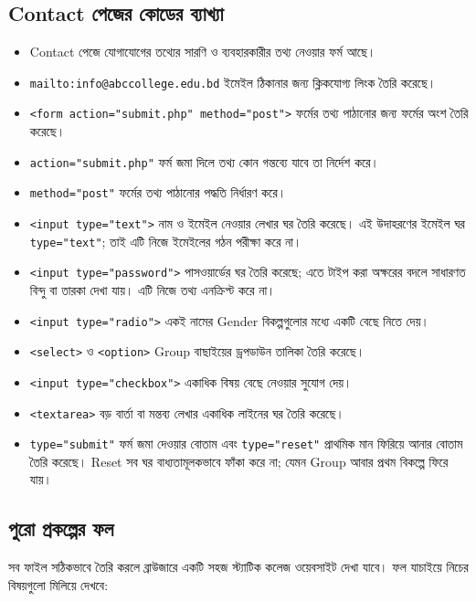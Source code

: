 \subsection{Contact পেজের কোডের ব্যাখ্যা}

\begin{itemize}
\item Contact পেজে যোগাযোগের তথ্যের সারণি ও ব্যবহারকারীর তথ্য নেওয়ার ফর্ম আছে।
\item \texttt{mailto:info@abccollege.edu.bd} ইমেইল ঠিকানার জন্য ক্লিকযোগ্য লিংক তৈরি করেছে।
\item \texttt{<form action="submit.php" method="post">} ফর্মের তথ্য পাঠানোর জন্য ফর্মের অংশ তৈরি করেছে।
\item \texttt{action="submit.php"} ফর্ম জমা দিলে তথ্য কোন গন্তব্যে যাবে তা নির্দেশ করে।
\item \texttt{method="post"} ফর্মের তথ্য পাঠানোর পদ্ধতি নির্ধারণ করে।
\item \texttt{<input type="text">} নাম ও ইমেইল নেওয়ার লেখার ঘর তৈরি করেছে। এই উদাহরণের ইমেইল ঘর \texttt{type="text"}; তাই এটি নিজে ইমেইলের গঠন পরীক্ষা করে না।
\item \texttt{<input type="password">} পাসওয়ার্ডের ঘর তৈরি করেছে; এতে টাইপ করা অক্ষরের বদলে সাধারণত বিন্দু বা তারকা দেখা যায়। এটি নিজে তথ্য এনক্রিপ্ট করে না।
\item \texttt{<input type="radio">} একই নামের Gender বিকল্পগুলোর মধ্যে একটি বেছে নিতে দেয়।
\item \texttt{<select>} ও \texttt{<option>} Group বাছাইয়ের ড্রপডাউন তালিকা তৈরি করেছে।
\item \texttt{<input type="checkbox">} একাধিক বিষয় বেছে নেওয়ার সুযোগ দেয়।
\item \texttt{<textarea>} বড় বার্তা বা মন্তব্য লেখার একাধিক লাইনের ঘর তৈরি করেছে।
\item \texttt{type="submit"} ফর্ম জমা দেওয়ার বোতাম এবং \texttt{type="reset"} প্রাথমিক মান ফিরিয়ে আনার বোতাম তৈরি করেছে। Reset সব ঘর বাধ্যতামূলকভাবে ফাঁকা করে না; যেমন Group আবার প্রথম বিকল্পে ফিরে যায়।
\end{itemize}

\subsection{পুরো প্রকল্পের ফল}

সব ফাইল সঠিকভাবে তৈরি করলে ব্রাউজারে একটি সহজ স্ট্যাটিক কলেজ ওয়েবসাইট দেখা যাবে। ফল যাচাইয়ে নিচের বিষয়গুলো মিলিয়ে দেখবে:

